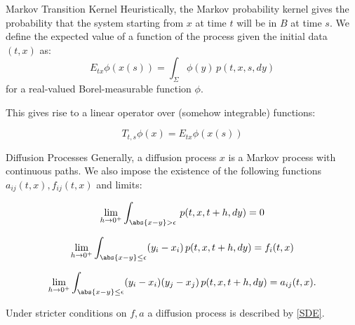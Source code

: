 \documentclass[10pt, compress]{beamer}
\begin{document}

\begin{frame}{Markov Transition Kernel}
    Heuristically, the Markov probability kernel gives the probability that the system starting from $x$ at time $t$ will be in $B$ at time $s$. We define the expected value of a function of the process given the initial data $(t,x)$ as:
    \[E_{tx}\phi(x(s)) = \int_{\Sigma} \phi(y)\,p(t,x,s,dy)\]
    for a real-valued Borel-measurable function $\phi$.

    This gives rise to a linear operator over (somehow integrable) functions:

    \[T_{t,s}\phi(x) = E_{tx}\phi(x(s))\]
\end{frame}

\begin{frame}{Diffusion Processes}
    Generally, a diffusion process $x$ is a Markov process with continuous paths. We also impose the existence of the following functions $a_{ij}(t,x),f_{ij}(t,x)$ and limits:

    \begin{equation}
            \lim_{h\to0^+} \int_{\abs{x-y}>\epsilon} \,p(t,x,t+h,dy) = 0
    \end{equation}

        \begin{equation}
            \lim_{h\to0^+} \int_{\abs{x-y}\leq\epsilon} (y_i-x_i)\,p(t,x,t+h,dy) = f_i(t,x)
        \end{equation}

        \begin{equation}
            \lim_{h\to0^+} \int_{\abs{x-y}\leq\epsilon} (y_i-x_i)(y_j-x_j)\,p(t,x,t+h,dy) = a_{ij}(t,x).
        \end{equation}

        Under stricter conditions on $f,a$ a diffusion process is described by \ref{SDE}.
    
\end{frame}
\end{document}
